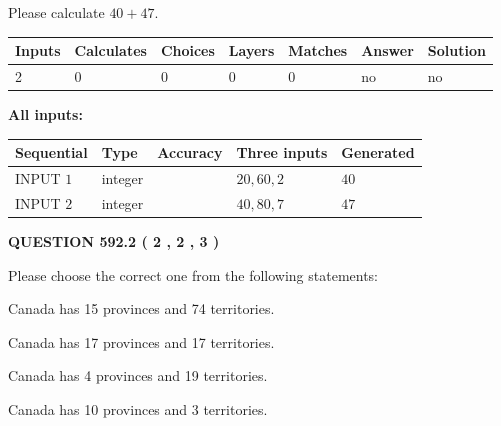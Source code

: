 \documentclass[12pt]{article}
\begin{document}
  
 
Please calculate $ %
40 +  %
47 $.
 
 
   
   
   
   
\noindent\begin{tabular}{|l|l|l|l|l|l|l|}
 \hline
Inputs & Calculates & Choices & Layers & Matches & Answer & Solution \\ \hline
 2  & 
 0  & 
 0
  & 
 0  & 
 0  & 
  no & 
  no 
  \\ \hline
 \end{tabular}
   
   
   
   
\noindent{}
   
   
   
   
\noindent\vspace{0.1in}\hspace{-0.08in} {\textbf{\Large{All inputs: }}}
   
   
  
  
\noindent\begin{tabular}{|l|l|l|l|l|}
\hline
 Sequential & Type & Accuracy & Three inputs & Generated \\ 
\hline
 
 
  INPUT $  1 $ & integer &  & $
 20
 , 
 60
 , 
 2
 $ & $ 40 $ 
 \\  \hline  
 
 
  INPUT $  2 $ & integer &  & $
 40
 , 
 80
 , 
 7
 $ & $ 47 $ 
 \\  \hline  
 \end{tabular}
   
   
  
\vspace{0.2in}
  
{\textbf{\Large{QUESTION
592.2 
 ( 2 , 2 , 3 )
}}}
  
  
Please choose the correct one from the following statements:
 
 
Canada has  15 provinces and  74 territories.
 
 
Canada has  17 provinces and  17 territories.
 
 
Canada has   4 provinces and  19 territories.
 
 
Canada has 10  provinces and 3 territories.
 
\end{document}

